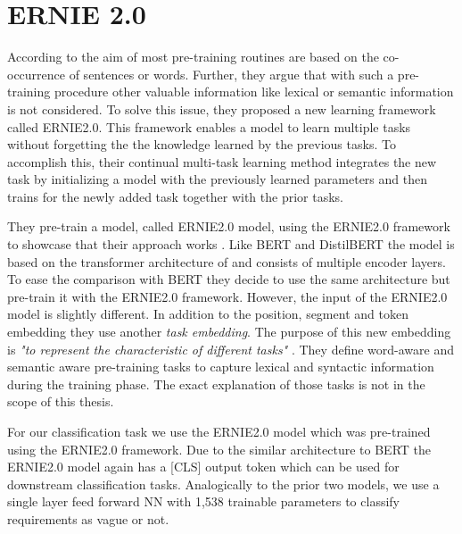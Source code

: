 \section{ERNIE 2.0}
\label{chp:approach:sec:ernie2.0}

According to \textcite{Sun:2019a} the aim of most pre-training routines are based on the co-occurrence of sentences or words.
Further, they argue that with such a pre-training procedure other valuable information like lexical or semantic information is not considered.
To solve this issue, they proposed a new learning framework called \ac{ERNIE2.0}.
This framework enables a model to learn multiple tasks without forgetting the the knowledge learned by the previous tasks.
To accomplish this, their continual multi-task learning method integrates the new task by initializing a model with the previously learned parameters and then trains for the newly added task together with the prior tasks.

They pre-train a model, called \ac{ERNIE2.0} model, using the \ac{ERNIE2.0} framework to showcase that their approach works .
Like \ac{BERT} and \ac{DistilBERT} the model is based on the transformer architecture of \textcite{Vaswani:2017} and consists of multiple encoder layers.
To ease the comparison with \ac{BERT} they decide to use the same architecture but pre-train it with the \ac{ERNIE2.0} framework.
However, the input of the \ac{ERNIE2.0} model is slightly different.
In addition to the position, segment and token embedding they use another \textit{task embedding}.
The purpose of this new embedding is \textit{"to represent the characteristic of different tasks"} \parencite{Sun:2019a}.
They define word-aware and semantic aware pre-training tasks to capture lexical and syntactic information during the training phase.
The exact explanation of those tasks is not in the scope of this thesis. \parencite{Sun:2019a}

For our classification task we use the \ac{ERNIE2.0} model which was pre-trained using the \ac{ERNIE2.0} framework.
Due to the similar architecture to \ac{BERT} the \ac{ERNIE2.0} model again has a [CLS] output token which can be used for downstream classification tasks.
Analogically to the prior two models, we use a single layer feed forward \ac{NN} with 1,538 trainable parameters to classify requirements as vague or not.
